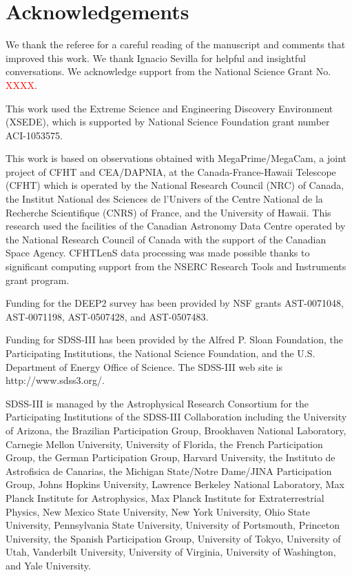\documentclass[useAMS,usenatbib]{mn2e}
\begin{document}
\section*{Acknowledgements}

We thank the referee for a careful reading of the manuscript
and comments that improved this work.
We thank Ignacio Sevilla for helpful and insightful conversations.
We acknowledge support from the National Science Grant No.
\textcolor{red}{XXXX}.

This work used the Extreme Science and Engineering Discovery Environment
(XSEDE), which is supported by National Science Foundation grant number
ACI-1053575.

This work is based on observations obtained with MegaPrime/MegaCam, a
joint project of CFHT and CEA/DAPNIA, at the Canada-France-Hawaii
Telescope (CFHT) which is operated by the National Research Council
(NRC) of Canada, the Institut National des Sciences de l'Univers of
the Centre National de la Recherche Scientifique (CNRS) of France, and
the University of Hawaii. This research used the facilities of the
Canadian Astronomy Data Centre operated by the National Research
Council of Canada with the support of the Canadian Space Agency.
CFHTLenS data processing was made possible thanks to significant
computing support from the NSERC Research Tools and Instruments grant
program.

Funding for the DEEP2 survey has been provided by NSF grants AST-0071048,
AST-0071198, AST-0507428, and AST-0507483. 

Funding for SDSS-III has been provided by the Alfred P. Sloan Foundation, the
Participating Institutions, the National Science Foundation, and the U.S.
Department of Energy Office of Science. The SDSS-III web site is
http://www.sdss3.org/.

SDSS-III is managed by the Astrophysical Research Consortium for the
Participating Institutions of the SDSS-III Collaboration including the
University of Arizona, the Brazilian Participation Group, Brookhaven National
Laboratory, Carnegie Mellon University, University of Florida, the French
Participation Group, the German Participation Group, Harvard University, the
Instituto de Astrofisica de Canarias, the Michigan State/Notre Dame/JINA
Participation Group, Johns Hopkins University, Lawrence Berkeley National
Laboratory, Max Planck Institute for Astrophysics, Max Planck Institute for
Extraterrestrial Physics, New Mexico State University, New York University,
Ohio State University, Pennsylvania State University, University of Portsmouth,
Princeton University, the Spanish Participation Group, University of Tokyo,
University of Utah, Vanderbilt University, University of Virginia, University
of Washington, and Yale University.
\end{document}
